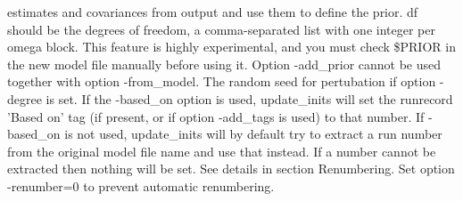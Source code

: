 \begin{optionlist}
estimates and covariances from output and use them to define the 
prior. df should be the degrees of freedom, a comma-separated list
with one integer per omega block.
This feature is highly experimental, and you must check \$PRIOR 
in the new model file manually before using it.
Option -add\_prior cannot be used together with option -from\_model. 
\nextopt
{}
The random seed for pertubation if option -degree is set.
\nextopt
{}
If the -based\_on option is used, update\_inits will set 
the runrecord 'Based on' tag (if present, or if option -add\_tags is used) 
to that number. 
If -based\_on is not used, update\_inits will by default try to extract 
a run number from the original model file name and use that instead.
If a number cannot be extracted then nothing will be set. 
\nextopt
{}
See details in section Renumbering.
Set option -renumber=0 to prevent automatic renumbering.
\nextopt
\end{optionlist}


